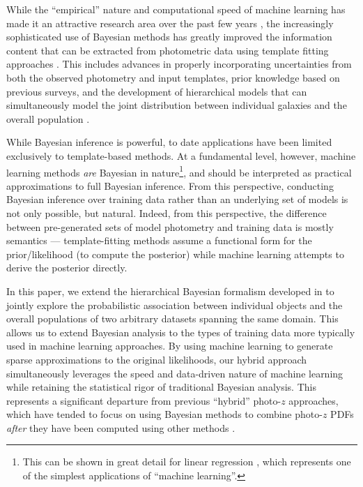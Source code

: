 \documentclass[a4paper,fleqn,usenatbib,english]{mnras}
\newcommand{\pz}{photo-$z$} %
\begin{document}
While the ``empirical'' nature and computational speed of machine learning has made it an attractive research area over the past few years \citep[see, e.g.,][for compilations of recent work]{hildebrandt+10,dahlen+13,sanchez+14}, the increasingly sophisticated use of Bayesian methods has greatly improved the information content that can be extracted from photometric data using template fitting approaches \citep{benitez00,moustakas+13}. This includes advances in properly incorporating uncertainties from both the observed photometry and input templates, prior knowledge based on previous surveys, and the development of hierarchical models that can simultaneously model the joint distribution between individual galaxies and the overall population \citep{brammer+08,tanaka15,speagleeisenstein15a,speagleeisenstein15b,leistedt+16}.

While Bayesian inference is powerful, to date applications have been limited exclusively to template-based methods. At a fundamental level, however, machine learning methods \textit{are} Bayesian in nature\footnote{This can be shown in great detail for linear regression \citep[see, e.g.,][]{hogg+10}, which represents one of the simplest applications of ``machine learning''.}, and should be interpreted as practical approximations to full Bayesian inference\citep{bishop06}. From this perspective, conducting Bayesian inference over training data rather than an underlying set of models is not only possible, but natural. Indeed, from this perspective, the difference between pre-generated sets of model photometry and training data is mostly semantics --- template-fitting methods assume a functional form for the prior/likelihood (to compute the posterior) while machine learning attempts to derive the posterior directly.

In this paper, we extend the hierarchical Bayesian formalism developed in \citet{leistedt+16} to jointly explore the probabilistic association between individual objects and the overall populations of two arbitrary datasets spanning the same domain. This allows us to extend Bayesian analysis to the types of training data more typically used in machine learning approaches. By using machine learning to generate sparse approximations to the original likelihoods, our hybrid approach simultaneously leverages the speed and data-driven nature of machine learning while retaining the statistical rigor of traditional Bayesian analysis. This represents a significant departure from previous ``hybrid'' {\pz} approaches, which have tended to focus on using Bayesian methods to combine {\pz} PDFs \textit{after} they have been computed using other methods \citep[see, e.g.,][]{carrascokindbrunner14b}.
\end{document}
